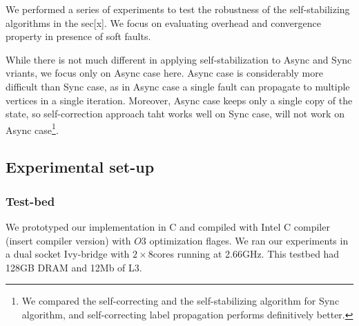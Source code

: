 We performed a series of experiments to test the robustness of the
self-stabilizing algorithms in the sec{[}x{]}. We focus on evaluating
overhead and convergence property in presence of soft faults. 

While there is not much different in applying self-stabilization to
Async and Sync vriants, we focus only on Async case here. Async case
is considerably more difficult than Sync case, as in Async case a
single fault can propagate to multiple vertices in a single iteration.
Moreover, Async case keeps only a single copy of the state, so self-correction
approach taht works well on Sync case, will not work on Async case\footnote{We compared the self-correcting and the self-stabilizing algorithm
for Sync algorithm, and self-correcting label propagation performs
definitively better.}.

\subsection{Experimental set-up}

\subsubsection{Test-bed}

We prototyped our implementation in C and compiled with Intel C compiler
(insert compiler version) with $O3$ optimization flages. We ran our
experiments in a dual socket Ivy-bridge with $2\times8$cores running
at 2.66GHz. This testbed had 128GB DRAM and 12Mb of L3.

